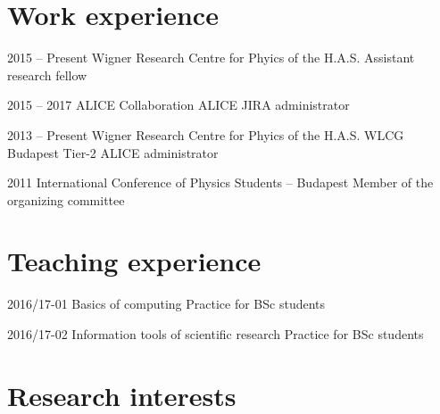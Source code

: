 \documentclass{tccv}
\begin{document}
%
%
%

\section{Work experience}

\begin{eventlist}

\item{2015 -- Present}
     {Wigner Research Centre for Phyics of the H.A.S.}
     {Assistant research fellow}
    
\item{2015 -- 2017}
     {ALICE Collaboration}
     {ALICE JIRA administrator}
    
\item{2013 -- Present}
     {Wigner Research Centre for Phyics of the H.A.S.}
     {WLCG Budapest Tier-2 ALICE administrator}
    
\item{2011}
     {International Conference of Physics Students -- Budapest}
    {Member of the organizing committee}

\end{eventlist}

%
%
%

\section{Teaching experience}

\begin{yearlist}

\item{2016/17-01}
{Basics of computing}
{Practice for BSc students}

\item{2016/17-02}
{Information tools of scientific research}
{Practice for BSc students}

\end{yearlist}

%
%
%

\section{Research interests}
\end{document}

